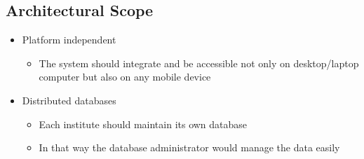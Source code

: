 \subsection{Architectural Scope}


\begin{itemize}	
		\item Platform independent
			\begin{itemize}
				\item The system should integrate and be accessible not only on 						desktop/laptop computer but also on any mobile device
			\end{itemize}
\end{itemize}

\begin{itemize}	
		\item Distributed databases
			\begin{itemize}
				\item Each institute should maintain its own database 
				\item In that way the database administrator would manage the data 						easily
			\end{itemize}
\end{itemize}

